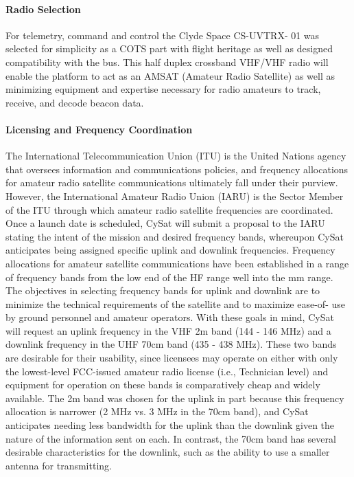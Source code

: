 \documentclass[nocover]            %
{CSLI}                       %
\begin{document}
\paragraph{Radio Selection\\}
For telemetry, command and control the Clyde Space CS-UVTRX- 01 was selected for simplicity as a COTS part with flight heritage as well as designed compatibility with the bus. This half duplex crossband VHF/VHF radio will enable the platform to act as an AMSAT (Amateur Radio Satellite) as well as minimizing equipment and expertise necessary for radio amateurs to track, receive, and decode beacon data. 
\paragraph{Licensing and Frequency Coordination\\}
The International Telecommunication Union (ITU) is the United Nations agency that oversees information and communications policies, and frequency allocations for amateur radio satellite communications ultimately fall under their purview. However, the International Amateur Radio Union (IARU) is the Sector Member of the ITU through which amateur radio satellite frequencies are coordinated. Once a launch date is scheduled, CySat will submit a proposal to the IARU stating the intent of the mission and desired frequency bands, whereupon CySat anticipates being assigned specific uplink and downlink frequencies. Frequency allocations for amateur satellite communications have been established in a range of frequency bands from the low end of the HF range well into the mm range. The objectives in selecting frequency bands for uplink and downlink are to minimize the technical requirements of the satellite and to maximize ease-of- use by ground personnel and amateur operators. With these goals in mind, CySat will request an uplink frequency in the VHF 2m band (144 - 146 MHz) and a downlink frequency in the UHF 70cm band (435 - 438 MHz). These two bands are desirable for their usability, since licensees may operate on either with only the lowest-level FCC-issued amateur radio license (i.e., Technician level) and equipment for operation on these bands is comparatively cheap and widely available. The 2m band was chosen for the uplink in part because this frequency allocation is narrower (2 MHz vs. 3 MHz in the 70cm band), and CySat anticipates needing less bandwidth for the uplink than the downlink given the nature of the information sent on each. In contrast, the 70cm band has several desirable characteristics for the downlink, such as the ability to use a smaller antenna for transmitting.
\end{document}
